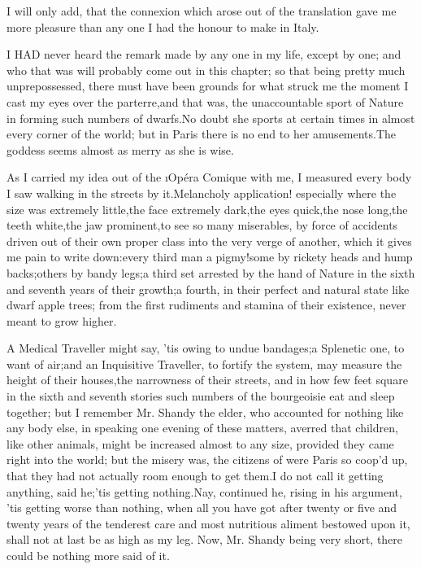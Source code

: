 \documentclass[twoside]{article}
\begin{document}
I will only add, that the connexion which arose out of the translation
gave me more pleasure than any one I had the honour to make in Italy.






I HAD never heard the remark made by any one in my life, except by one;
and who that was will probably come out in this chapter; so that being
pretty much unprepossessed, there must have been grounds for what struck
me the moment I cast my eyes over the parterre,\tsk and that was, the
unaccountable sport of Nature in forming such numbers of dwarfs.\tsk No doubt
she sports at certain times in almost every corner of the world; but in
Paris there is no end to her amusements.\tsk The goddess seems almost as
merry as she is wise.

As I carried my idea out of the \i{Opéra Comique} with me, I measured every
body I saw walking in the streets by it.\tsk Melancholy application!
especially where the size was extremely little,\tsk the face extremely
dark,\tsk the eyes quick,\tsk the nose long,\tsk the teeth white,\tsk the jaw
prominent,\tsk to see so many miserables, by force of accidents driven out of
their own proper class into the very verge of another, which it gives me
pain to write down:\tsk every third man a pigmy!\tsk some by rickety heads and
hump backs;\tsk others by bandy legs;\tsk a third set arrested by the hand of
Nature in the sixth and seventh years of their growth;\tsk a fourth, in their
perfect and natural state like dwarf apple trees; from the first
rudiments and stamina of their existence, never meant to grow higher.

A Medical Traveller might say, ’tis owing to undue bandages;\tsk a Splenetic
one, to want of air;\tsk and an Inquisitive Traveller, to fortify the system,
may measure the height of their houses,\tsk the narrowness of their streets,
and in how few feet square in the sixth and seventh stories such numbers
of the bourgeoisie eat and sleep together; but I remember Mr. Shandy the
elder, who accounted for nothing like any body else, in speaking one
evening of these matters, averred that children, like other animals,
might be increased almost to any size, provided they came right into the
world; but the misery was, the citizens of were Paris so coop’d up, that
they had not actually room enough to get them.\tsk I do not call it getting
anything, said he;\tsk ’tis getting nothing.\tsk Nay, continued he, rising in his
argument, ’tis getting worse than nothing, when all you have got after
twenty or five and twenty years of the tenderest care and most nutritious
aliment bestowed upon it, shall not at last be as high as my leg.  Now,
Mr. Shandy being very short, there could be nothing more said of it.
\end{document}
